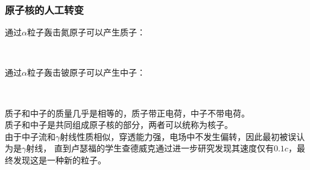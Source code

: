 \documentclass[UTF8]{ctexart}
\begin{document}
\subsubsection{原子核的人工转变}
    通过$\alpha$粒子轰击氮原子可以产生质子：
    \begin{center}
        \\[5mm]
    \end{center}
    通过$\alpha$粒子轰击铍原子可以产生中子：
    \begin{center}
        \\[5mm]
    \end{center}
    质子和中子的质量几乎是相等的，质子带正电荷，中子不带电荷。\\[3mm]
    质子和中子是共同组成原子核的部分，两者可以统称为核子。\\[3mm]
    由于中子流和$\gamma$射线性质相似，穿透能力强，电场中不发生偏转，因此最初被误认为是$\gamma$射线，
    直到卢瑟福的学生查德威克通过进一步研究发现其速度仅有$0.1c$，最终发现这是一种新的粒子。

\newpage
\end{document}
